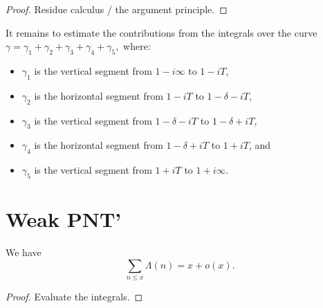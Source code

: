 \begin{proof}
Residue calculus / the argument principle.
\end{proof}



It remains to estimate the contributions from the integrals over the curve $\gamma = \gamma_1 +
\gamma_2 + \gamma_3 + \gamma_4
+\gamma_5,
$
where:
\begin{itemize}
\item $\gamma_1$ is the vertical segment from $1-i\infty$ to $1-iT$,
\item $\gamma_2$ is the horizontal segment from $1-iT$ to $1-\delta-iT$,
\item $\gamma_3$ is the vertical segment from $1-\delta-iT$ to $1-\delta+iT$,
\item $\gamma_4$ is the horizontal segment from $1-\delta+iT$ to $1+iT$, and
\item $\gamma_5$ is the vertical segment from $1+iT$ to $1+i\infty$.
\end{itemize}




\section{Weak PNT'}

\begin{theorem}\label{WeakPNT'}  We have
$$ \sum_{n \leq x} \Lambda(n) = x + o(x).$$
\end{theorem}



\begin{proof}
  Evaluate the integrals.
\end{proof}


